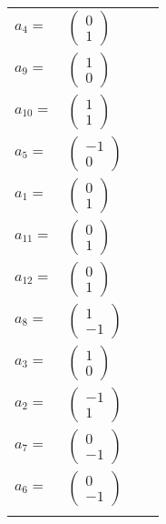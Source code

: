 \documentclass[1p]{elsarticle_modified}
\theoremstyle{definition}
\begin{document}
\begin{tabular}{m{7pt} m{180pt} m{7pt} m{180pt} }
\flushright $a_{4}=$&$\begin{pmatrix}0\\1\end{pmatrix}$ \\
\flushright $a_{9}=$&$\begin{pmatrix}1\\0\end{pmatrix}$ \\
\flushright $a_{10}=$&$\begin{pmatrix}1\\1\end{pmatrix}$ \\
\flushright $a_{5}=$&$\begin{pmatrix}-1\\0\end{pmatrix}$ \\
\flushright $a_{1}=$&$\begin{pmatrix}0\\1\end{pmatrix}$ \\
\flushright $a_{11}=$&$\begin{pmatrix}0\\1\end{pmatrix}$ \\
\flushright $a_{12}=$&$\begin{pmatrix}0\\1\end{pmatrix}$ \\
\flushright $a_{8}=$&$\begin{pmatrix}1\\-1\end{pmatrix}$ \\
\flushright $a_{3}=$&$\begin{pmatrix}1\\0\end{pmatrix}$ \\
\flushright $a_{2}=$&$\begin{pmatrix}-1\\1\end{pmatrix}$ \\
\flushright $a_{7}=$&$\begin{pmatrix}0\\-1\end{pmatrix}$ \\
\flushright $a_{6}=$&$\begin{pmatrix}0\\-1\end{pmatrix}$\\&\end{tabular}
\end{document}
